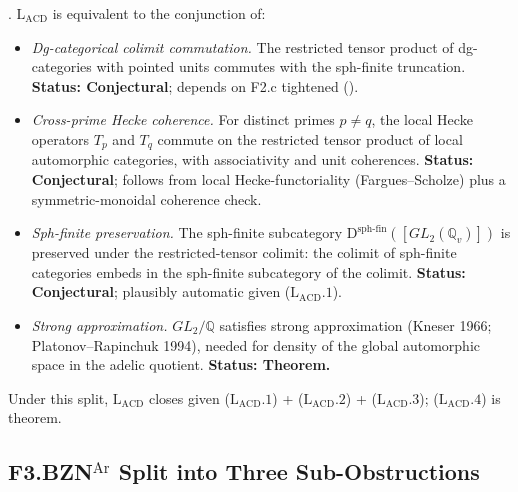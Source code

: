 \begin{theorem}
\label{v4-arith:sw:thm:LACD-split}
\ClaimStatusProvedHere. \(\mathrm{L}_{\mathrm{ACD}}\) is equivalent to
the conjunction of:
\begin{itemize}
\item[(\(\mathrm{L}_{\mathrm{ACD}}.1\))] \emph{Dg-categorical colimit
commutation.} The restricted tensor product of dg-categories
with pointed units commutes with the sph-finite truncation.
\textbf{Status: Conjectural}; depends on F2.c tightened
().
\item[(\(\mathrm{L}_{\mathrm{ACD}}.2\))] \emph{Cross-prime Hecke
coherence.} For distinct primes \(p\neq q\), the local Hecke
operators \(T_{p}\) and \(T_{q}\) commute on the restricted tensor
product of local automorphic categories, with associativity and
unit coherences.
\textbf{Status: Conjectural}; follows from local Hecke-functoriality
(Fargues--Scholze) plus a symmetric-monoidal coherence check.
\item[(\(\mathrm{L}_{\mathrm{ACD}}.3\))] \emph{Sph-finite preservation.}
The sph-finite subcategory
\(\mathrm{D}^{\mathrm{sph\text{-}fin}}([GL_{2}(\mathbb{Q}_{v})])\) is
preserved under the restricted-tensor colimit: the colimit of
sph-finite categories embeds in the sph-finite subcategory of the
colimit.
\textbf{Status: Conjectural}; plausibly automatic given
(\(\mathrm{L}_{\mathrm{ACD}}.1\)).
\item[(\(\mathrm{L}_{\mathrm{ACD}}.4\))] \emph{Strong approximation.}
\(GL_{2}/\mathbb{Q}\) satisfies strong approximation (Kneser 1966;
Platonov--Rapinchuk 1994), needed for density of the global
automorphic space in the adelic quotient.
\textbf{Status: Theorem.}
\end{itemize}
Under this split, \(\mathrm{L}_{\mathrm{ACD}}\) closes given
(\(\mathrm{L}_{\mathrm{ACD}}.1\)) + (\(\mathrm{L}_{\mathrm{ACD}}.2\)) +
(\(\mathrm{L}_{\mathrm{ACD}}.3\)); (\(\mathrm{L}_{\mathrm{ACD}}.4\))
is theorem.
\end{theorem}

\subsection{\texorpdfstring{F3.BZN\(^{\mathrm{Ar}}\)}{F3-BZN-Ar} Split into Three Sub-Obstructions}

